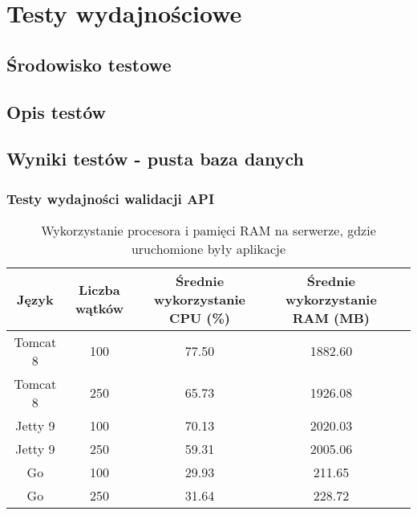 \chapter{Testy wydajnościowe}
\section{Środowisko testowe}
\section{Opis testów}
\section{Wyniki testów - pusta baza danych}

\newpage
\subsection{Testy wydajności walidacji API}
% 

\begin{table}[!htb]
\centering
\caption{Wykorzystanie procesora i pamięci RAM na serwerze, gdzie uruchomione były aplikacje}
\label{my-label}
\begin{tabular}{@{}ccccl@{}}
\toprule
\textbf{Język} & \textbf{Liczba wątków} & \multicolumn{1}{p{3cm}}{\textbf{Średnie wykorzystanie CPU (\%)}} & \multicolumn{1}{p{3cm}}{\textbf{Średnie wykorzystanie RAM (MB)}} &  \\ \midrule
Tomcat 8       & 100                    & 77.50                             & 1882.60                          &  \\
Tomcat 8       & 250                    & 65.73                            & 1926.08                          &  \\
Jetty 9        & 100                    & 70.13                            & 2020.03                          &  \\
Jetty 9        & 250                    & 59.31                            & 2005.06                          &  \\
Go             & 100                    & 29.93                            & 211.65                           &  \\
Go             & 250                    & 31.64                            & 228.72                           &  \\ 
\bottomrule
\end{tabular}
\end{table}

